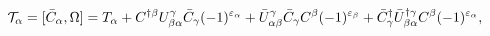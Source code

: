 \begin{equation}\label{5.12}
{\cal T}_\alpha=[\bar{C}_\alpha,\Omega]=T_\alpha+
C^{\dagger\beta}U^\gamma_{\beta\alpha}\bar{C}_\gamma(-1)^{\varepsilon_\alpha}
+\bar{U}^\gamma_{\alpha\beta}\bar{C}_\gamma C^\beta(-1)^{\varepsilon_\beta}+
\bar{C}^\dagger_\gamma\bar{U}^{\dagger\gamma}_{\beta\alpha}
C^\beta(-1)^{\varepsilon_\alpha},
\end{equation}

